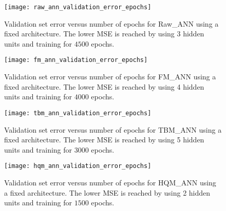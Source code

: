 \begin{figure}[H]
	\begin{center}
		\texttt{[image: raw\_ann\_validation\_error\_epochs]}
		\caption[Validation set error versus number of epochs for Raw\_ANN using fixed architecture]{Validation set error versus number of epochs for Raw\_ANN using a fixed architecture. The lower MSE is reached by using 3 hidden units and training for $4500$ epochs.}
		\label{fig:raw_ann_validation_error_epochs}
	\end{center}
\end{figure}
\begin{figure}[H]
	\begin{center}
		\texttt{[image: fm\_ann\_validation\_error\_epochs]}
		\caption[Validation set error versus number of epochs for FM\_ANN using fixed architecture]{Validation set error versus number of epochs for FM\_ANN using a fixed architecture. The lower MSE is reached by using 4 hidden units and training for $4000$ epochs.}
		\label{fig:fm_ann_validation_error_epochs}
	\end{center}
\end{figure}
\begin{figure}[H]
	\begin{center}
		\texttt{[image: tbm\_ann\_validation\_error\_epochs]}
		\caption[Validation set error versus number of epochs for TBM\_ANN using fixed architecture]{Validation set error versus number of epochs for TBM\_ANN using a fixed architecture. The lower MSE is reached by using 5 hidden units and training for $3000$ epochs.}
		\label{fig:tbm_ann_validation_error_epochs}
	\end{center}
\end{figure}
\begin{figure}[H]
	\begin{center}
		\texttt{[image: hqm\_ann\_validation\_error\_epochs]}
		\caption[Validation set error versus number of epochs for HQM\_ANN using fixed architecture]{Validation set error versus number of epochs for HQM\_ANN using a fixed architecture. The lower MSE is reached by using 2 hidden units and training for $1500$ epochs.}
		\label{fig:hqm_ann_validation_error_epochs}
	\end{center}
\end{figure}


